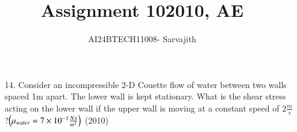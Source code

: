 \documentclass[journal]{IEEEtran}
\begin{document}

\vspace{3cm}


\author{AI24BTECH11008- Sarvajith
}
\title{Assignment 10}
{\let\newpage\relax\maketitle}
\title{2010, AE}
\renewcommand{\thefigure}{\theenumi}
\renewcommand{\thetable}{\theenumi}
\setlength{\intextsep}{10pt} %
\renewcommand{\thetable}{\theenumi}
\begin{enumerate}
 \item[14.] Consider an incompressible 2-D Couette flow of water between two walls spaced 1m apart. The lower wall is kept stationary. What is the shear stress acting on the lower wall if the upper wall is moving at a constant speed of $2\frac{m}{s}$?$\left(\mu_{water}=7\times 10^{-1}\frac{Ns}{m^2}\right)$ \hfill (2010)
 \begin{figure}[!ht]
    \centering
\end{figure}
\end{enumerate}
\end{document}
